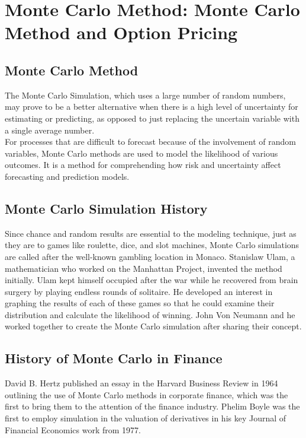 
\chapter{Monte Carlo Method: Monte Carlo Method and Option Pricing}

\section{Monte Carlo Method}
\noindent The Monte Carlo Simulation, which uses a large number of random numbers, may prove to be a better alternative when there is a high level of uncertainty for estimating or predicting, as opposed to just replacing the uncertain variable with a single average number.\\[2mm]
For processes that are difficult to forecast because of the involvement of random variables, Monte Carlo methods are used to model the likelihood of various outcomes. It is a method for comprehending how risk and uncertainty affect forecasting and prediction models.
\section{Monte Carlo Simulation History}
Since chance and random results are essential to the modeling technique, just as they are to games like roulette, dice, and slot machines, Monte Carlo simulations are called after the well-known gambling location in Monaco.
Stanislaw Ulam, a mathematician who worked on the Manhattan Project, invented the method initially. Ulam kept himself occupied after the war while he recovered from brain surgery by playing endless rounds of solitaire. He developed an interest in graphing the results of each of these games so that he could examine their distribution and calculate the likelihood of winning. John Von Neumann and he worked together to create the Monte Carlo simulation after sharing their concept.
\section{History of Monte Carlo in Finance}
David B. Hertz published an essay in the Harvard Business Review in 1964 outlining the use of Monte Carlo methods in corporate finance, which was the first to bring them to the attention of the finance industry. Phelim Boyle was the first to employ simulation in the valuation of derivatives in his key Journal of Financial Economics work from 1977.\\[2mm]

